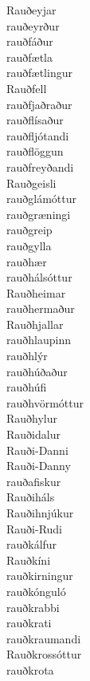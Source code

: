 \documentclass[../samsetningasafn.tex]{subfiles}
\begin{document}
\begin{bigwordlist}
\begin{footnotesize}
\begin{multicols}{4}
\begin{description}
		\item [Rauðeyjar]
		\item [rauðeyrður]
		\item [rauðfáður]
		\item [rauðfætla]
		\item [rauðfætlingur]
		\item [Rauðfell]
		\item [rauðfjaðraður]
		\item [rauðflísaður]
		\item [rauðfljótandi]
		\item [rauðflöggun]
		\item [rauðfreyðandi]
		\item [Rauðgeisli]
		\item [rauðglámóttur]
		\item [rauðgræningi]
		\item [rauðgreip]
		\item [rauðgylla]
		\item [rauðhær]
		\item [rauðhálsóttur]
		\item [Rauðheimar]
		\item [rauðhermaður]
		\item [Rauðhjallar]
		\item [rauðhlaupinn]
		\item [rauðhlýr]
		\item [rauðhúðaður]
		\item [rauðhúfi]
		\item [rauðhvörmóttur]
		\item [Rauðhylur]
		\item [Rauðidalur]
		\item [Rauði-Danni]
		\item [Rauði-Danny]
		\item [rauðafiskur]
		\item [Rauðiháls]
		\item [Rauðihnjúkur]
		\item [Rauði-Rudi]
		\item [rauðkálfur]
		\item [Rauðkíni]
		\item [rauðkirningur]
		\item [rauðkónguló]
		\item [rauðkrabbi]
		\item [rauðkrati]
		\item [rauðkraumandi]
		\item [Rauðkrossóttur]
		\item [rauðkrota]

\end{description}
\end{multicols}
\end{footnotesize}
\end{bigwordlist}
\end{document}
